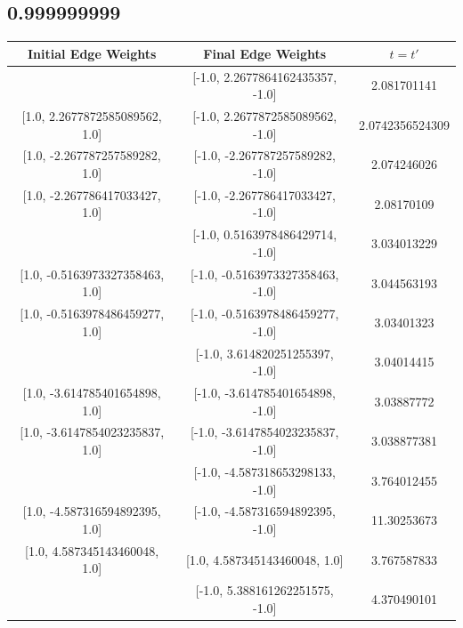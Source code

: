 \documentclass[aps]{revtex4-2}
\begin{document}
\subsection{0.999999999}
\begin{center}
    \begin{tabular}{||c c c||}
        \hline
        Initial Edge Weights&Final Edge Weights&$t=t'$\\
        \hline
        [1.0, 2.2677864162435357, 1.0]&[-1.0, 2.2677864162435357, -1.0]&2.081701141\\

        [1.0, 2.2677872585089562, 1.0]&[-1.0, 2.2677872585089562, -1.0]&2.0742356524309\\

        [1.0, -2.267787257589282, 1.0]&[-1.0, -2.267787257589282, -1.0]&2.074246026\\

        [1.0, -2.267786417033427, 1.0]&[-1.0, -2.267786417033427, -1.0]&2.08170109\\
        \hline
        [1.0, 0.5163978486429714, 1.0]&[-1.0, 0.5163978486429714, -1.0]&3.034013229\\
        
        [1.0, -0.5163973327358463, 1.0]&[-1.0, -0.5163973327358463, -1.0]&3.044563193\\

        [1.0, -0.5163978486459277, 1.0]&[-1.0, -0.5163978486459277, -1.0]&3.03401323\\
        \hline
        [1.0, 3.614820251255397, 1.0]&[-1.0, 3.614820251255397, -1.0]&3.04014415\\
        
        [1.0, -3.614785401654898, 1.0]&[-1.0, -3.614785401654898, -1.0]&3.03887772\\

        [1.0, -3.6147854023235837, 1.0]&[-1.0, -3.6147854023235837, -1.0]&3.038877381\\
        \hline
        [1.0, -4.587318653298133, 1.0]&[-1.0, -4.587318653298133, -1.0]&3.764012455\\
        
        [1.0, -4.587316594892395, 1.0]&[-1.0, -4.587316594892395, -1.0]&11.30253673\\

        [1.0, 4.587345143460048, 1.0]&[1.0, 4.587345143460048, 1.0]&3.767587833\\
        \hline
        [1.0, 5.388161262251575, 1.0]&[-1.0, 5.388161262251575, -1.0]&4.370490101\\


\end{tabular}
\end{center}
\end{document}
